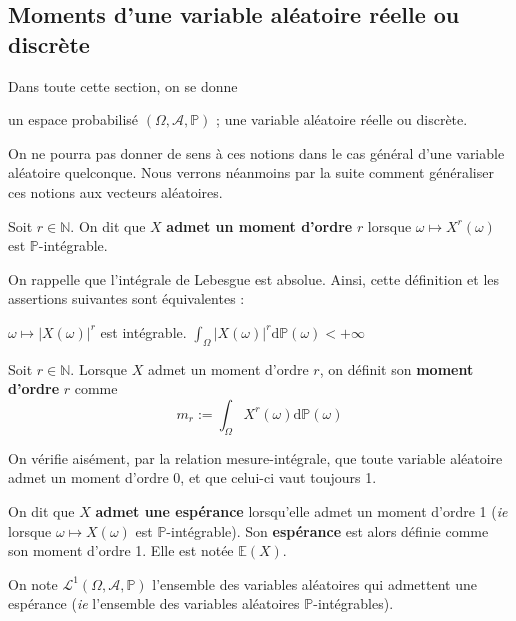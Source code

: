 \documentclass[../integ-proba.tex]{subfiles}
\begin{document}
\subsection{Moments d'une variable aléatoire réelle ou discrète}

Dans toute cette section, on se donne
\begin{itemize}
    \itemb un espace probabilisé $\left(\Omega, \mathcal{A}, \mathbb{P}\right)$ ;
    \itemb une variable aléatoire réelle ou discrète.
\end{itemize}

On ne pourra pas donner de sens à ces notions dans le cas général d'une variable aléatoire quelconque.
Nous verrons néanmoins par la suite comment généraliser ces notions aux vecteurs aléatoires.

\begin{defi}
    Soit $r\in\mathbb{N}$. On dit que $X$ \textbf{admet un moment d'ordre} $r$ lorsque $\omega \mapsto X^r(\omega)$ est $\mathbb{P}$-intégrable.
\end{defi}

\begin{rem}
    On rappelle que l'intégrale de Lebesgue est absolue. Ainsi, cette définition et les assertions suivantes sont équivalentes :
    \begin{itemize}
        \itemb $\omega \mapsto \left|X(\omega)\right|^r$ est intégrable.
        \itemb $\displaystyle \int_\Omega\left|X(\omega)\right|^r\text{d}\mathbb{P}(\omega) < +\infty$
    \end{itemize}
\end{rem}

\begin{defi}
    Soit $r\in\mathbb{N}$. Lorsque $X$ admet un moment d'ordre $r$, on définit son \textbf{moment d'ordre } $r$ comme
    $$m_r := \int_\Omega X^r(\omega)\text{d}\mathbb{P}(\omega)$$
\end{defi}

\begin{rem}
    On vérifie aisément, par la relation mesure-intégrale, que toute variable aléatoire admet un moment d'ordre 0, et que celui-ci vaut toujours 1.
\end{rem}

\begin{defi}
    On dit que $X$ \textbf{admet une espérance} lorsqu'elle admet un moment d'ordre 1 (\textit{ie} lorsque $\omega \mapsto X\left(\omega\right)$ est $\mathbb{P}$-intégrable).
    Son \textbf{espérance} est alors définie comme son moment d'ordre 1.
    Elle est notée $\mathbb{E}(X)$.

    On note $\mathcal{L}^1\left(\Omega, \mathcal{A}, \mathbb{P}\right)$ l'ensemble des variables aléatoires qui admettent une espérance (\textit{ie} l'ensemble des variables aléatoires $\mathbb{P}$-intégrables).
\end{defi}
\end{document}
